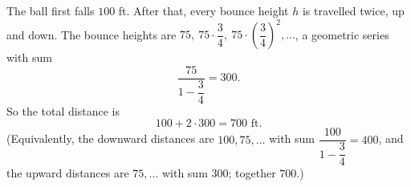 The ball first falls $100$ ft. After that, every bounce height $h$ is travelled twice, up and down. The bounce heights are $75,\ 75\cdot\dfrac{3}{4},\ 75\cdot\left(\dfrac{3}{4}\right)^2,\dots$, a geometric series with sum
\[
\dfrac{75}{1-\dfrac{3}{4}}=300 .
\]
So the total distance is
\[
100+2\cdot300=\boxed{700\text{ ft}}.
\]
(Equivalently, the downward distances are $100,75,\dots$ with sum $\dfrac{100}{1-\dfrac{3}{4}}=400$, and the upward distances are $75,\dots$ with sum $300$; together $700$.)
